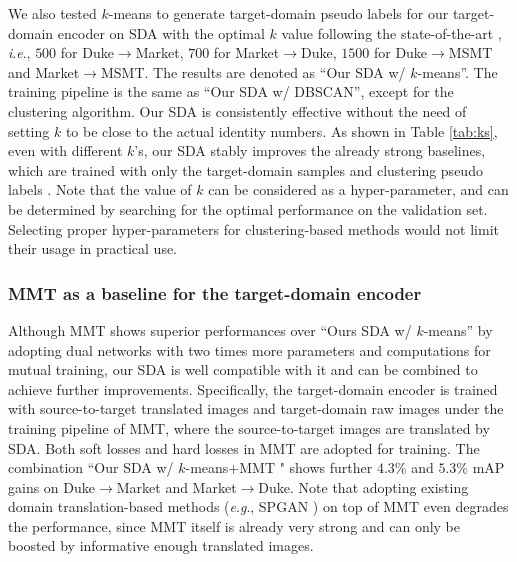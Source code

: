 \documentclass[journal]{IEEEtran}
\newcommand{\ie}{\textit{i}.\textit{e}., }
\newcommand{\eg}{\textit{e}.\textit{g}., }
\begin{document}
We also tested $k$-means to generate target-domain pseudo labels for our target-domain encoder on SDA with the optimal $k$ value following the state-of-the-art \cite{ge2020mutual}, \ie
$500$ for Duke$\to$Market, $700$ for Market$\to$Duke, $1500$ for Duke$\to$MSMT and Market$\to$MSMT.
The results are denoted as ``Our SDA w/ {$k$-means}''.
The training pipeline is the same as ``Our SDA w/ {DBSCAN}'', except for the clustering algorithm.
Our SDA is consistently effective without the need of setting $k$ to be close to the actual identity numbers.
As shown in Table \ref{tab:ks}, even with different $k$'s, our SDA stably improves the already strong {baselines}, which are trained with only the target-domain samples and clustering pseudo labels \cite{song2018unsupervised}.
 {Note that the value of $k$ can be considered as a hyper-parameter, and can be determined by searching for the optimal performance on the validation set. Selecting proper hyper-parameters for clustering-based methods would not limit their usage in practical use.}


\subsubsection{\textbf{MMT \cite{ge2020mutual} as a baseline for the target-domain encoder}}

Although MMT \cite{ge2020mutual} shows superior performances over ``Ours SDA w/ $k$-means'' by adopting dual networks with two times more parameters and computations for mutual training,
our SDA is well compatible with it and can be combined to achieve further improvements.
Specifically, the target-domain encoder is trained with source-to-target translated images and target-domain raw images under the training pipeline of MMT, where the source-to-target images are translated by SDA.
Both soft losses and hard losses in MMT are adopted for training.
The combination ``Our SDA w/ $k$-means+MMT \cite{ge2020mutual}" shows further $4.3\%$ and $5.3\%$ mAP gains on Duke$\to$Market and Market$\to$Duke.
 {Note that adopting existing domain translation-based methods (\eg SPGAN \cite{deng2018image}) on top of MMT \cite{ge2020mutual} even degrades the performance, since MMT \cite{ge2020mutual} itself is already very strong and can only be boosted by informative enough translated images.}
\end{document}
